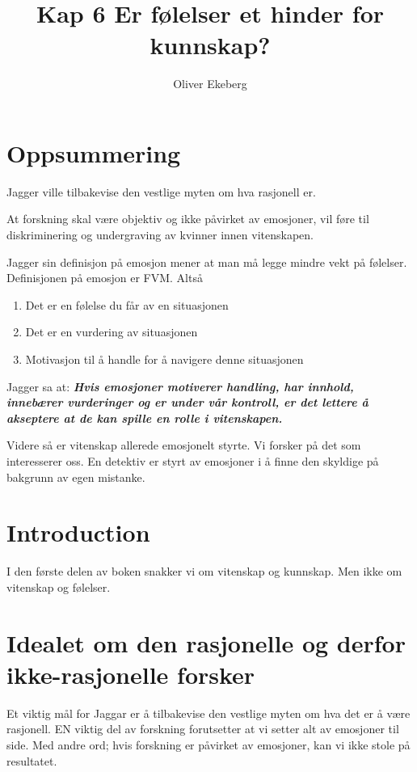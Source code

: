 \documentclass[11pt, a4paper]{article}
\title{Kap 6 Er følelser et hinder for kunnskap?}
\author{Oliver Ekeberg}
\date{}
\begin{document}
\maketitle


\tableofcontents


\section{Oppsummering}


Jagger ville tilbakevise den vestlige myten om hva rasjonell er. 

At forskning skal være objektiv og ikke påvirket av emosjoner, vil føre til diskriminering og undergraving av kvinner innen vitenskapen.

Jagger sin definisjon på emosjon mener at man må legge mindre vekt på følelser. Definisjonen på emosjon er FVM. Altså
\begin{enumerate}
    \item Det er en følelse du får av en situasjonen
    \item Det er en vurdering av situasjonen
    \item Motivasjon til å handle for å navigere denne situasjonen
\end{enumerate}


Jagger sa at: \textbf{\textit{Hvis emosjoner motiverer handling, har innhold, innebærer vurderinger og er under vår kontroll, er det lettere å akseptere at de kan spille en rolle i vitenskapen.}}


Videre så er vitenskap allerede emosjonelt styrte. Vi forsker på det som interesserer oss. En detektiv er styrt av emosjoner i å finne den skyldige på bakgrunn av egen mistanke.

\section{Introduction}
\label{sec:introduction}

I den første delen av boken snakker vi om vitenskap og kunnskap. Men ikke om vitenskap og følelser. 

\section{Idealet om den rasjonelle og derfor ikke-rasjonelle forsker}
\label{sec:argument}

Et viktig mål for Jaggar er å tilbakevise den vestlige myten om hva det er å være rasjonell. EN viktig del av forskning forutsetter at vi setter alt av emosjoner til side.
Med andre ord; hvis forskning er påvirket av emosjoner, kan vi ikke stole på resultatet.
\end{document}

